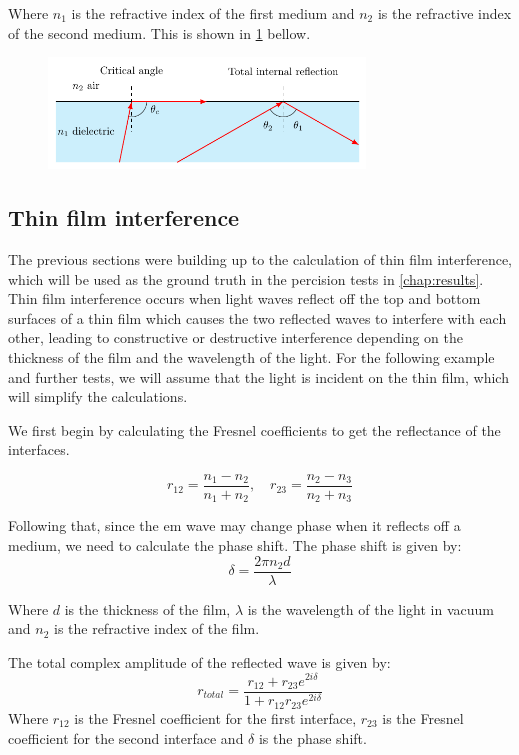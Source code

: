 Where $n_1$ is the refractive index of the first medium and $n_2$ is the refractive index of the second medium. This is shown in \cref{fig:snell} bellow.

\begin{figure}[H]\label{fig:snell}
  \centering
  \includegraphics[width=0.75\textwidth]{figures/snell.pdf}
  \caption{}
\end{figure}


\subsection{Thin film interference}
The previous sections were building up to the calculation of thin film interference, which will be used as the ground truth in the percision tests in \cref{chap:results}. Thin film interference occurs when light waves reflect off the top and bottom surfaces of a thin film which causes the two reflected waves to interfere with each other, leading to constructive or destructive interference depending on the thickness of the film and the wavelength of the light. For the following example and further tests, we will assume that the light is incident on the thin film, which will simplify the calculations. 

We first begin by calculating the Fresnel coefficients to get the reflectance of the interfaces.

\begin{equation}
  r_{12}=\frac{n_1-n_2}{n_1+n_2},\quad r_{23}=\frac{n_2-n_3}{n_2+n_3}
\end{equation}

Following that, since the \gls{em} wave may change phase when it reflects off a medium, we need to calculate the phase shift. The phase shift is given by:
\begin{equation}
  \delta = \frac{2\pi n_2 d}{\lambda}
\end{equation}

Where $d$ is the thickness of the film, $\lambda$ is the wavelength of the light in vacuum and $n_2$ is the refractive index of the film.

The total complex amplitude of the reflected wave is given by:
\begin{equation}
  r_{total} = \frac{r_{12} + r_{23} e^{2 i \delta}}{1+ r_{12} r_{23} e^{2 i \delta}}
\end{equation}
Where $r_{12}$ is the Fresnel coefficient for the first interface, $r_{23}$ is the Fresnel coefficient for the second interface and $\delta$ is the phase shift.

